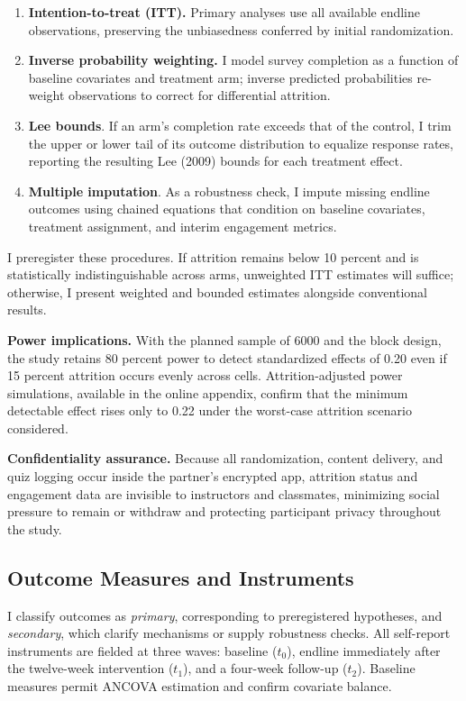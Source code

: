 \documentclass[12pt, american]{article}
\begin{document}
\begin{enumerate}
    \item \textbf{Intention-to-treat (ITT).}  Primary analyses use all available endline observations, preserving the unbiasedness conferred by initial randomization.
    \item \textbf{Inverse probability weighting.}  I model survey completion as a function of baseline covariates and treatment arm; inverse predicted probabilities re-weight observations to correct for differential attrition.
    \item \textbf{Lee bounds}.  If an arm’s completion rate exceeds that of the control, I trim the upper or lower tail of its outcome distribution to equalize response rates, reporting the resulting Lee (2009) bounds for each treatment effect.
    \item \textbf{Multiple imputation}.  As a robustness check, I impute missing endline outcomes using chained equations that condition on baseline covariates, treatment assignment, and interim engagement metrics.
\end{enumerate}

I preregister these procedures.  If attrition remains below 10 percent and is statistically indistinguishable across arms, unweighted ITT estimates will suffice; otherwise, I present weighted and bounded estimates alongside conventional results.

\textbf{Power implications.} With the planned sample of 6000 and the block design, the study retains 80 percent power to detect standardized effects of 0.20 even if 15 percent attrition occurs evenly across cells.  Attrition-adjusted power simulations, available in the online appendix, confirm that the minimum detectable effect rises only to 0.22 under the worst-case attrition scenario considered.

\textbf{Confidentiality assurance.} Because all randomization, content delivery, and quiz logging occur inside the partner’s encrypted app, attrition status and engagement data are invisible to instructors and classmates, minimizing social pressure to remain or withdraw and protecting participant privacy throughout the study.


\subsection{Outcome Measures and Instruments}

I classify outcomes as \textit{primary}, corresponding to preregistered hypotheses, and \textit{secondary}, which clarify mechanisms or supply robustness checks.  All self-report instruments are fielded at three waves: baseline ($t_{0}$), endline immediately after the twelve-week intervention ($t_{1}$), and a four-week follow-up ($t_{2}$).  Baseline measures permit ANCOVA estimation and confirm covariate balance.
\end{document}
